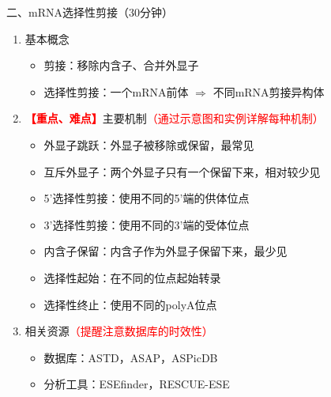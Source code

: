 \documentclass{TIJMUjiaoanLL}
\begin{document}
\vspace*{0.2cm}
\noindent
二、mRNA选择性剪接（30分钟）
\begin{enumerate}
  \item 基本概念
    \begin{itemize}
      \item 剪接：移除内含子、合并外显子
      \item 选择性剪接：一个mRNA前体 $\Rightarrow$ 不同mRNA剪接异构体
    \end{itemize}
  \item \textcolor{red}{\textbf{【重点、难点】}}主要机制\textcolor{red}{（通过示意图和实例详解每种机制）}
    \begin{itemize}
      \item 外显子跳跃：外显子被移除或保留，最常见
      \item 互斥外显子：两个外显子只有一个保留下来，相对较少见
      \item 5'选择性剪接：使用不同的5'端的供体位点
      \item 3'选择性剪接：使用不同的3'端的受体位点
      \item 内含子保留：内含子作为外显子保留下来，最少见
      \item 选择性起始：在不同的位点起始转录
      \item 选择性终止：使用不同的polyA位点
    \end{itemize}
  \item 相关资源\textcolor{red}{（提醒注意数据库的时效性）}
    \begin{itemize}
      \item 数据库：ASTD，ASAP，ASPicDB
      \item 分析工具：ESEfinder，RESCUE-ESE
    \end{itemize}
\end{enumerate}


\otherTail
\newpage
\otherHeader
\end{document}
